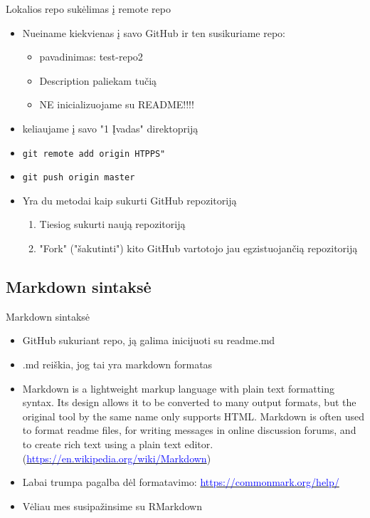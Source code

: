 \documentclass[11pt,xcolor=table]{beamer}
\begin{document}
\begin{frame}{Lokalios repo sukėlimas į remote repo}
\begin{itemize}
\item Nueiname kiekvienas į savo GitHub ir ten susikuriame repo:
\begin{itemize}
\item pavadinimas: test-repo2
\item Description paliekam tučią
\item NE inicializuojame su README!!!!
\end{itemize}
\item keliaujame į savo "1 Įvadas" direktopriją
\item \colorbox{listinggray}{\lstinline|git remote add origin HTPPS"|}
\item \colorbox{listinggray}{\lstinline|git push origin master|}
\end{itemize}
\end{frame}


\begin{frame}
\begin{itemize}
\item Yra du metodai kaip sukurti GitHub repozitoriją
\begin{enumerate}
\item Tiesiog sukurti naują repozitoriją
\item "Fork" ("šakutinti") kito GitHub vartotojo jau egzistuojančią repozitoriją
\end{enumerate}
\end{itemize}
\end{frame}

\subsection{Markdown sintaksė}
\begin{frame}[fragile]{Markdown sintaksė}
\begin{itemize}
\item GitHub sukuriant repo, ją galima inicijuoti su readme.md
\item .md reiškia, jog tai yra markdown formatas
\item Markdown is a lightweight markup language with plain text formatting syntax. Its design allows it to be converted to many output formats, but the original tool by the same name only supports HTML. Markdown is often used to format readme files, for writing messages in online discussion forums, and to create rich text using a plain text editor. (\href{https://en.wikipedia.org/wiki/Markdown}{\textcolor{blue}{https://en.wikipedia.org/wiki/Markdown}})
\item Labai trumpa pagalba dėl formatavimo: \href{https://commonmark.org/help/}{\textcolor{blue}{https://commonmark.org/help/}}
\item Vėliau mes susipažinsime su RMarkdown
\end{itemize}
\end{frame}
\end{document}
